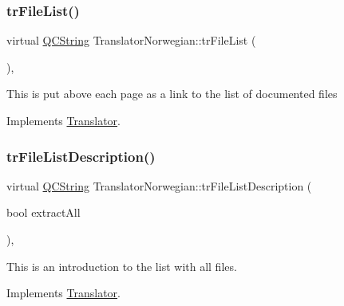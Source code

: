 \mbox{\label{class_translator_norwegian_a5b81b0c810a3c96109a245eb5cf61c7c}} 
\subsubsection{\texorpdfstring{trFileList()}{trFileList()}}
{\footnotesize\ttfamily virtual \mbox{\hyperlink{class_q_c_string}{Q\+C\+String}} Translator\+Norwegian\+::tr\+File\+List (\begin{DoxyParamCaption}{ }\end{DoxyParamCaption})\hspace{0.3cm}{\ttfamily [inline]}, {\ttfamily [virtual]}}

This is put above each page as a link to the list of documented files 

Implements \mbox{\hyperlink{class_translator}{Translator}}.

\mbox{\label{class_translator_norwegian_a4fd299e2c38cf34ed514bb3de01aeaf0}} 
\subsubsection{\texorpdfstring{trFileListDescription()}{trFileListDescription()}}
{\footnotesize\ttfamily virtual \mbox{\hyperlink{class_q_c_string}{Q\+C\+String}} Translator\+Norwegian\+::tr\+File\+List\+Description (\begin{DoxyParamCaption}\item[{bool}]{extract\+All }\end{DoxyParamCaption})\hspace{0.3cm}{\ttfamily [inline]}, {\ttfamily [virtual]}}

This is an introduction to the list with all files. 

Implements \mbox{\hyperlink{class_translator}{Translator}}.

\mbox{\label{class_translator_norwegian_a32c4b846f22c62e2813f5c481fd19833}} 
